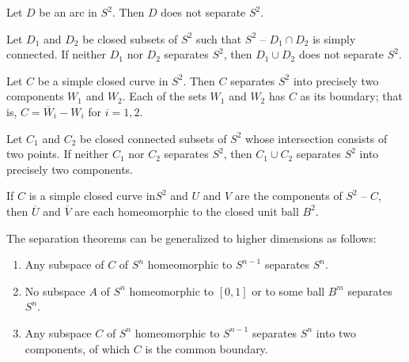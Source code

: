 \begin{theorem}
Let $D$ be an arc in $S^2$. Then $D$ does not separate $S^2$.
\end{theorem}


\begin{theorem}
Let $D_1$ and $D_2$ be closed subsets of $S^2$ such that $S^2 \text{ -- } D_1 \cap D_2$ is simply connected. 
If neither $D_1$ nor $D_2$ separates $S^2$, then $D_1 \cup D_2$ does not separate $S^2$.
\end{theorem}


\begin{theorem}
Let $C$ be a simple closed curve in $S^2$. Then $C$ separates $S^2$ into precisely two components $W_1$ and $W_2$. Each of the sets
$W_1$ and $W_2$ has $C$ as its boundary; that is, $C = \overline{W}_i - W_i$ for $i = 1, 2$.  
\end{theorem}

\begin{theorem}
Let $C_1$ and $C_2$ be closed connected subsets of $S^2$ whose intersection consists of two points. If neither $C_1$ nor $C_2$ separates $S^2$,
then $C_1 \cup C_2$ separates $S^2$ into precisely two components.
\end{theorem}

\begin{theorem}
If $C$ is a simple closed curve in$ S^2$ and $U$ and $V$ are the components of $S^2 \text{ -- } C$, then $\overline{U}$ and $\overline{V}$
are each homeomorphic to the closed unit ball $B^2$. 
\end{theorem}

\begin{remark}
The separation theorems can be generalized to higher dimensions as follows:
\begin{enumerate}
    \item Any subspace of $C$ of $S^n$ homeomorphic to $S^{n-1}$ separates $S^n$.
    \item No subspace $A$ of $S^n$ homeomorphic to $[0, 1]$ or to some ball $B^m$ separates $S^n$.
    \item Any subspace $C$ of $S^n$ homeomorphic to $S^{n-1}$ separates $S^n$ into two components, of which $C$ is the common boundary.
\end{enumerate}
\end{remark}



